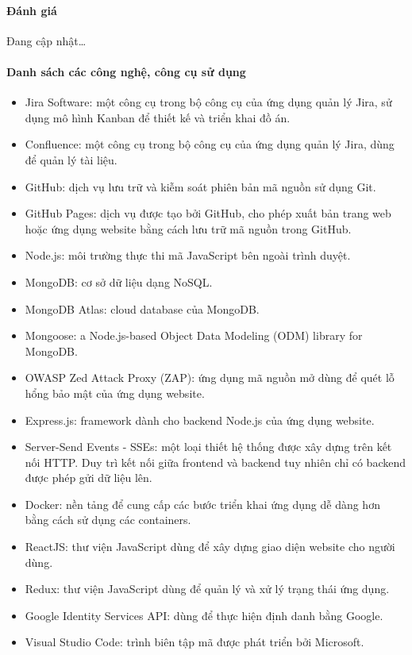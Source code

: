 \paragraph{Đánh giá}
\tab Đang cập nhật\dots

\paragraph{Danh sách các công nghệ, công cụ sử dụng}
\begin{itemize}
    \item Jira Software: một công cụ trong bộ công cụ của ứng dụng quản lý Jira, sử dụng mô hình Kanban để thiết kế và triển khai đồ án.
    \item Confluence: một công cụ trong bộ công cụ của ứng dụng quản lý Jira, dùng để quản lý tài liệu.
    \item GitHub: dịch vụ lưu trữ và kiễm soát phiên bản mã nguồn sử dụng Git.
    \item GitHub Pages: dịch vụ được tạo bởi GitHub, cho phép xuất bản trang web hoặc ứng dụng website bằng cách lưu trữ mã nguồn trong GitHub.
    \item Node.js: môi trường thực thi mã JavaScript bên ngoài trình duyệt.
    \item MongoDB: cơ sở dữ liệu dạng NoSQL.
    \item MongoDB Atlas: cloud database của MongoDB.
    \item Mongoose: a Node.js-based Object Data Modeling (ODM) library for MongoDB.
    \item OWASP Zed Attack Proxy (ZAP): ứng dụng mã nguồn mở dùng để quét lỗ hổng bảo mật của ứng dụng website.
    \item Express.js: framework dành cho backend Node.js của ứng dụng website.
    \item Server-Send Events - SSEs: một loại thiết hệ thống được xây dựng trên kết nối HTTP. Duy trì kết nối giữa frontend và backend tuy nhiên chỉ có backend được phép gửi dữ liệu lên.
    \item Docker: nền tảng để cung cấp các bước triển khai ứng dụng dễ dàng hơn bằng cách sử dụng các containers.
    \item ReactJS: thư viện JavaScript dùng để xây dựng giao diện website cho người dùng.
    \item Redux: thư viện JavaScript dùng để quản lý và xử lý trạng thái ứng dụng.
    \item Google Identity Services API: dùng để thực hiện định danh bằng Google.
    \item Visual Studio Code: trình biên tập mã được phát triển bởi Microsoft.
\end{itemize}